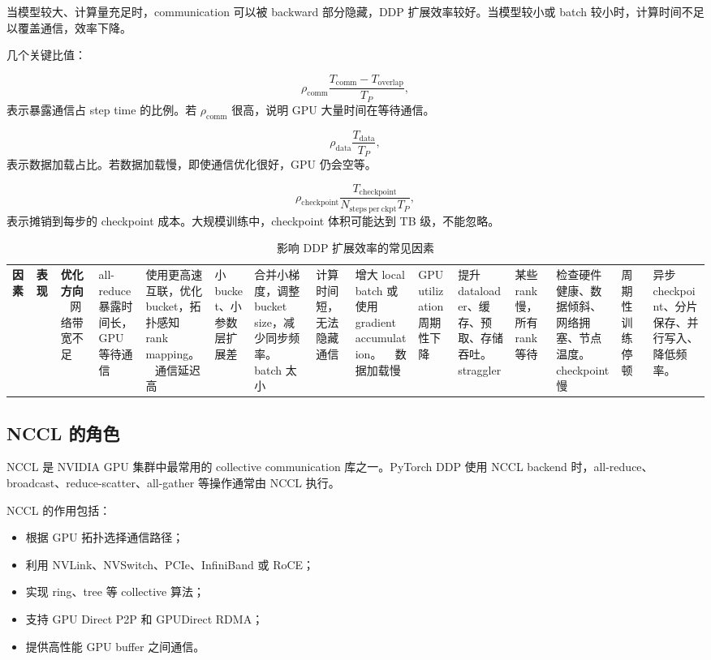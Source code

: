 当模型较大、计算量充足时，communication 可以被 backward 部分隐藏，DDP 扩展效率较好。当模型较小或 batch 较小时，计算时间不足以覆盖通信，效率下降。

几个关键比值：

\[
\rho_{\mathrm{comm}}
\frac{T_{\mathrm{comm}}-T_{\mathrm{overlap}}}{T_P},
\]
表示暴露通信占 step time 的比例。若 $\rho_{\mathrm{comm}}$ 很高，说明 GPU 大量时间在等待通信。

\[
\rho_{\mathrm{data}}
\frac{T_{\mathrm{data}}}{T_P},
\]
表示数据加载占比。若数据加载慢，即使通信优化很好，GPU 仍会空等。

\[
\rho_{\mathrm{checkpoint}}
\frac{T_{\mathrm{checkpoint}}}{N_{\mathrm{steps\ per\ ckpt}}T_P},
\]
表示摊销到每步的 checkpoint 成本。大规模训练中，checkpoint 体积可能达到 TB 级，不能忽略。

\begin{table}[H]
\centering
\small
\caption{影响 DDP 扩展效率的常见因素}
\label{tab:ddp-scaling-factors}
\begin{tabular}{p{}p{}p{}}
\toprule
\textbf{因素} & \textbf{表现} & \textbf{优化方向} \
\midrule
网络带宽不足
& all-reduce 暴露时间长，GPU 等待通信
& 使用更高速互联，优化 bucket，拓扑感知 rank mapping。 \
\midrule
通信延迟高
& 小 bucket、小参数层扩展差
& 合并小梯度，调整 bucket size，减少同步频率。 \
\midrule
batch 太小
& 计算时间短，无法隐藏通信
& 增大 local batch 或使用 gradient accumulation。 \
\midrule
数据加载慢
& GPU utilization 周期性下降
& 提升 dataloader、缓存、预取、存储吞吐。 \
\midrule
straggler
& 某些 rank 慢，所有 rank 等待
& 检查硬件健康、数据倾斜、网络拥塞、节点温度。 \
\midrule
checkpoint 慢
& 周期性训练停顿
& 异步 checkpoint、分片保存、并行写入、降低频率。 \
\bottomrule
\end{tabular}
\end{table}

\subsection{NCCL 的角色}
\label{subsec:nccl-role}

NCCL 是 NVIDIA GPU 集群中最常用的 collective communication 库之一。PyTorch DDP 使用 NCCL backend 时，all-reduce、broadcast、reduce-scatter、all-gather 等操作通常由 NCCL 执行。

NCCL 的作用包括：

\begin{itemize}
\item 根据 GPU 拓扑选择通信路径；
\item 利用 NVLink、NVSwitch、PCIe、InfiniBand 或 RoCE；
\item 实现 ring、tree 等 collective 算法；
\item 支持 GPU Direct P2P 和 GPUDirect RDMA；
\item 提供高性能 GPU buffer 之间通信。
\end{itemize}


